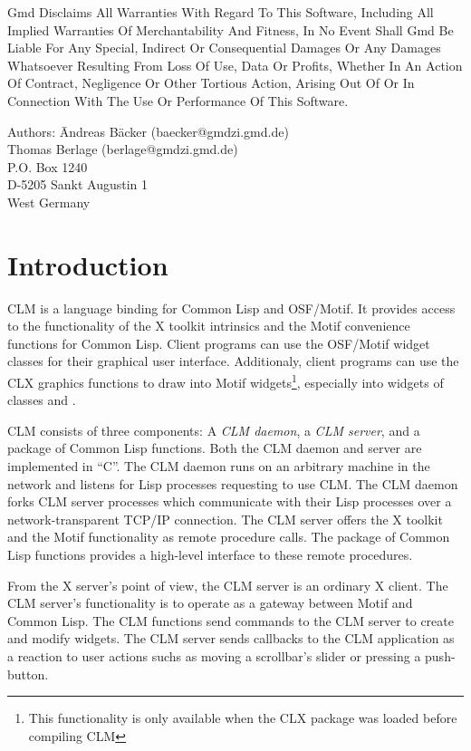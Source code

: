 \sc Gmd Disclaims All Warranties With Regard To This Software, Including All
Implied Warranties Of Merchantability And Fitness, In No Event Shall Gmd Be
Liable For Any Special, Indirect Or Consequential Damages Or Any Damages
Whatsoever Resulting From Loss Of Use, Data Or Profits, Whether In An Action Of
Contract, Negligence Or Other Tortious Action, Arising Out Of Or In Connection
With The Use Or Performance Of This Software.  \rm

\begin{tabbing}
Authors: \= Andreas B\"acker (baecker@gmdzi.gmd.de)\\
         \> Thomas Berlage (berlage@gmdzi.gmd.de)\\
         \> P.O. Box 1240\\
         \> D-5205 Sankt Augustin 1\\
         \> West Germany\\
\end{tabbing}

\tableofcontents

\chapter{Introduction}

CLM is a language binding for Common Lisp and OSF/Motif.  It provides access to
the functionality of the X toolkit intrinsics and the Motif convenience 
functions for Common Lisp. Client programs can use the OSF/Motif widget classes
for their graphical user interface. Additionaly, client programs can use the
CLX graphics functions to draw into Motif widgets\footnote{This functionality is
only available when the CLX package was loaded before compiling CLM},
especially into widgets of classes  and 
.

CLM consists of three components: A {\it CLM daemon}, a {\it CLM server},
and a package of Common Lisp functions.  Both the CLM daemon and server are
implemented in ``C''.  The CLM daemon runs on an arbitrary machine in the
network and listens for Lisp processes requesting to use CLM.  The CLM daemon
forks CLM server processes which communicate with their Lisp processes over a
network-transparent TCP/IP connection.  The CLM server offers the X toolkit
and the Motif functionality as remote procedure calls.  The package of Common
Lisp functions provides a high-level interface to these remote procedures. 

From the X server's point of view, the CLM server is an ordinary X client. 
The CLM server's functionality is to operate as a gateway between Motif and
Common Lisp.  The CLM functions send commands to the CLM server to create and
modify widgets.  The CLM server sends callbacks to the CLM application as a
reaction to user actions suchs as moving a scrollbar's slider or pressing a
push-button. 

